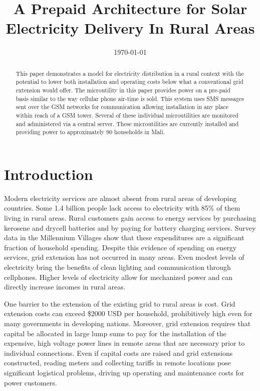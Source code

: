\documentclass{sig-alternate}
\begin{document}
\title{A Prepaid Architecture for Solar Electricity Delivery In Rural Areas}
\date{\today}
\maketitle

\begin{abstract}
This paper demonstrates a model for electricity
distribution in a rural context with the potential
to lower both installation and operating costs below
what a conventional grid extension would offer.
The microutility in this paper provides power on a
pre-paid basis similar to the way cellular phone
air-time is sold.
This system uses SMS messages sent 
over the GSM networks
for communication allowing installation in any place
within reach of a GSM tower.
Several of these individual microutilities are monitored
and administered via a central server.
These microutilities are currently installed and providing
power to approximately 90 households in Mali.
\end{abstract}

\section{Introduction}
Modern electricity services are almost absent from rural
areas of developing countries.
Some 1.4 billion people lack access to electricity with 85\% of
them living in rural areas.\cite{WEO2010}
Rural customers gain access to energy services by purchasing
kerosene and drycell batteries and by paying for battery charging
services.
Survey data in the Millennium Villages show that these expenditures
are a significant fraction of household spending.\cite{MVPEnergy}
Despite this evidence of spending on energy services,
grid extension has not occurred in many areas.
Even modest levels of electricity bring the benefits of clean lighting
and communication through cellphones.\cite{Cabraal:2005}
Higher levels of electricity allow for mechanized power and can
directly increase incomes in rural areas.\cite{Kirubi:2009}

One barrier to the extension of the existing grid to rural areas is cost.
Grid extension costs can exceed \$2000 USD per household, prohibitively
high even for many governments in developing
nations.\cite{ModiPlanningKenya}
Moreover, grid extension requires that capital be allocated in large
lump sums to pay for the installation of the expensive, high voltage power
lines in remote areas that are necessary prior to individual connections.
Even if capital costs are raised and grid extensions constructed,
reading meters and collecting tariffs in remote locations pose
significant logistical problems, driving up operating and maintenance
costs for power customers.
\end{document}
